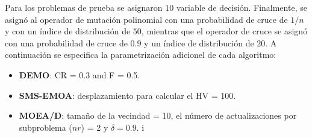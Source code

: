 % 
Para los problemas de prueba \UF{} se asignaron $10$ variable de decisión.
%
Finalmente, se asignó al operador de mutación polinomial con una probabilidad de cruce de $1/n$ y con un índice de distribución de $50$, mientras que el operador de cruce \SBX{} se asignó con una probabilidad de cruce de $0.9$ y un índice de distribución de $20$.
%
A continuación se especifica la parametrización adicionel de cada algoritmo:
\begin{itemize}
\item \textbf{DEMO}: CR = 0.3 and F = 0.5.
\item \textbf{SMS-EMOA}: desplazamiento para calcular el HV = 100.
\item \textbf{MOEA/D}: tamaño de la vecindad = 10, el número de actualizaciones por subproblema ($nr$) = 2 y $\delta = 0.9$.
i%
\end{itemize}

